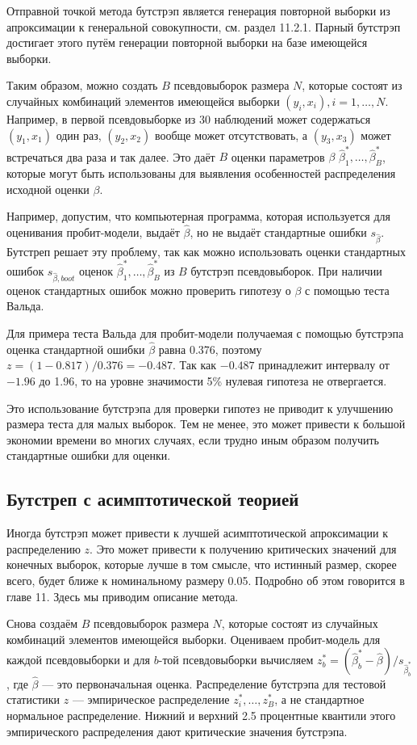 Отправной точкой метода бутстрэп является генерация повторной выборки из апроксимации к генеральной совокупности, см. раздел 11.2.1. Парный бутстрэп достигает этого путём генерации повторной выборки на базе имеющейся выборки.

Таким образом, можно создать $B$ псевдовыборок размера $N$, которые состоят из случайных комбинаций элементов имеющейся выборки $(y_i, x_i), i = 1, \dots, N$. Например, в первой псевдовыборке из 30 наблюдений может содержаться $(y_1, x_1)$ один раз, $(y_2, x_2)$ вообще может отсутствовать, а $(y_3, x_3)$ может встречаться два раза и так далее. Это даёт $B$ оценки параметров $\beta$ $\hat{\beta}_1^*, \dots, \hat{\beta}_B^*$, которые могут быть использованы для выявления особенностей распределения исходной оценки $\beta$. 

Например, допустим, что компьютерная программа, которая используется для оценивания пробит-модели, выдаёт $\hat{\beta}$, но не выдаёт стандартные ошибки $s_{\hat{\beta}}$. Бутстреп решает эту проблему, так как можно использовать оценки стандартных ошибок $s_{\hat{\beta}, boot}$ оценок $\hat{\beta}_1^*, \dots, \hat{\beta}_B^*$ из $B$ бутстрэп псевдовыборок. При наличии оценок стандартных ошибок можно проверить гипотезу о $\beta$  с помощью теста Вальда.

Для примера теста Вальда для пробит-модели получаемая с помощью бутстрэпа оценка стандартной ошибки $\hat{\beta}$ равна 0.376, поэтому $z = (1 - 0.817) / 0.376 = - 0.487$. Так как $- 0.487$ принадлежит интервалу от $- 1.96$ до 1.96, то на уровне значимости 5\% нулевая гипотеза не отвергается.

Это использование бутстрэпа для проверки гипотез не приводит к улучшению размера теста для малых выборок. Тем не менее, это может привести к большой экономии времени во многих случаях, если трудно иным образом получить стандартные ошибки для оценки.

\subsection{Бутстреп с асимптотической теорией}

Иногда бутстрэп может привести к лучшей асимптотической апроксимации к распределению $z$. Это может привести к получению критических значений для конечных выборок, которые лучше в том смысле, что истинный размер, скорее всего, будет ближе к номинальному размеру 0.05. Подробно об этом говорится в главе 11. Здесь мы приводим описание метода.

Снова создаём $B$ псевдовыборок размера $N$, которые состоят из случайных комбинаций элементов имеющейся выборки. Оцениваем пробит-модель для каждой псевдовыборки и для $b$-той псевдовыборки вычисляем $z_b^* = (\hat{\beta}_b^* - \hat{\beta}) / s_{\hat{\beta}_b^*}$, где $\hat{\beta}$ --- это первоначальная оценка. Распределение бутстрэпа для тестовой статистики $z$ --- эмпирическое распределение $z_i^*, \dots, z_B^*$, а не стандартное нормальное распределение. Нижний и верхний 2.5 процентные квантили этого эмпирического распределения дают критические значения бутстрэпа.

